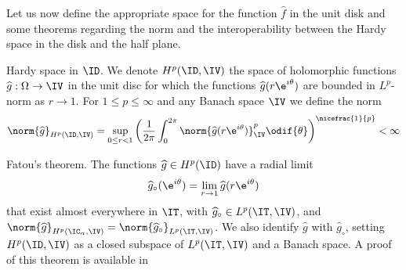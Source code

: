 Let us now define the appropriate space for the function $\widehat{f}$ in the unit disk and some theorems regarding the norm and the interoperability between the Hardy space in the disk and the half plane.
\begin{definition}{Hardy space in $\ID$.} \label{df:Hardy-disk}
     We denote $H^p(\ID,\IV)$ the space of holomorphic functions $\widehat{g}: \Omega \rightarrow \IV$ in the unit disc for which the functions $\widehat{g}(r\e^{\imath \theta})$ are bounded in $L^p$-norm as $r \rightarrow 1$. For $1\leq p \leq \infty$ and any Banach space $\IV$ we define the norm
    \begin{equation} \label{eq:HC-norm}
        \norm{\widehat{g}}_{H^p(\ID, \IV)} = \sup_{0 \leq r < 1} \left( \frac{1}{2\pi} \int_{0}^{2\pi} \norm{\widehat{g}(r\e^{i\theta})}_{\IV}^p \odif{\theta} \right)^{\nicefrac{1}{p}} < \infty
    \end{equation}
\end{definition}
\begin{theorem}{Fatou's theorem.} \label{th:Fatou}
    The functions $\widehat{g} \in H^p(\ID)$ have a radial limit $$\widehat{g}_\circ (\e^{i\theta}) = \lim_{r\rightarrow 1} \widehat{g}(r\e^{i\theta})$$ that exist almost everywhere in $\IT$, with $\widehat{g}_\circ \in L^p(\IT,\IV)$, and $\norm{\widehat{g}}_{H^p(\IC_\alpha,\IV)} = \norm{\widehat{g}_\circ}_{L^p(\IT,\IV)}$. We also identify $\widehat{g}$ with $\widehat{g}_\circ$, setting $H^p(\ID,\IV)$ as a closed subspace of $L^p(\IT,\IV)$ and a Banach space. A proof of this theorem is available in \cite{RR97}
\end{theorem}

